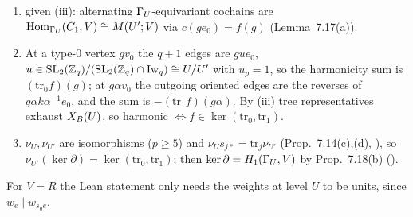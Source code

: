 \begin{outline}
\begin{enumerate}
\item \stproved{} given (iii): alternating $\Gamma_U$-equivariant cochains are $\operatorname{Hom}_{\Gamma_U}(C_1,V)\cong M(U';V)$ via $c(ge_0)=f(g)$ (Lemma~7.17(a)).
\item At a type-$0$ vertex $gv_0$ the $q+1$ edges are $gue_0$, $u\in\mathrm{SL}_2(\mathbb{Z}_q)/(\mathrm{SL}_2(\mathbb{Z}_q)\cap\mathrm{Iw}_q)\cong U/U'$ with $u_p=1$, so the
harmonicity sum is $(\mathrm{tr}_0f)(g)$; at $g\alpha v_0$ the outgoing oriented edges are the reverses of $g\alpha k\alpha^{-1}e_0$, and the sum
is $-(\mathrm{tr}_1f)(g\alpha)$. By (iii) tree representatives exhaust $X_B(U)$, so harmonic $\Leftrightarrow f\in\ker(\mathrm{tr}_0,\mathrm{tr}_1)$.
\item $\nu_U,\nu_{U'}$ are isomorphisms ($p\ge5$) and $\nu_U s_{j*}=\mathrm{tr}_j\nu_{U'}$ (Prop.~7.14(c),(d), \stproved), so
$\nu_{U'}(\ker\partial)=\ker(\mathrm{tr}_0,\mathrm{tr}_1)$; then $\ker\partial=H_1(\Gamma_U,V)$ by Prop.~7.18(b) (\stpmc).
\end{enumerate}
For $V=R$ the Lean statement only needs the weights at level $U$ to be units, since $w_e\mid w_{s_0e}$.
\end{outline}

